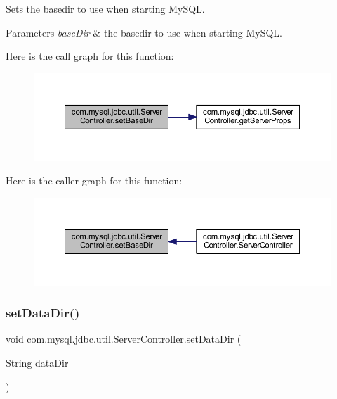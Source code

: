 Sets the basedir to use when starting My\+S\+QL.


\begin{DoxyParams}{Parameters}
{\em base\+Dir} & the basedir to use when starting My\+S\+QL. \\
\hline
\end{DoxyParams}
Here is the call graph for this function\+:
\nopagebreak
\begin{figure}[H]
\begin{center}
\leavevmode
\includegraphics[width=350pt]{classcom_1_1mysql_1_1jdbc_1_1util_1_1_server_controller_a231fbe6ed87c19ede2f71fa92e79cf78_cgraph}
\end{center}
\end{figure}
Here is the caller graph for this function\+:
\nopagebreak
\begin{figure}[H]
\begin{center}
\leavevmode
\includegraphics[width=350pt]{classcom_1_1mysql_1_1jdbc_1_1util_1_1_server_controller_a231fbe6ed87c19ede2f71fa92e79cf78_icgraph}
\end{center}
\end{figure}
\mbox{\label{classcom_1_1mysql_1_1jdbc_1_1util_1_1_server_controller_a722d9aabaa42a36226901125e1580e72}} 
\subsubsection{\texorpdfstring{set\+Data\+Dir()}{setDataDir()}}
{\footnotesize\ttfamily void com.\+mysql.\+jdbc.\+util.\+Server\+Controller.\+set\+Data\+Dir (\begin{DoxyParamCaption}\item[{String}]{data\+Dir }\end{DoxyParamCaption})}

